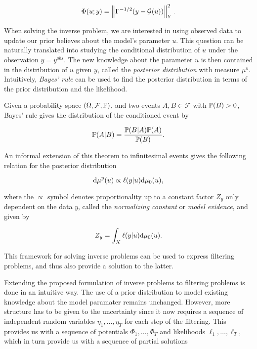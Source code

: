 \begin{equation} \label{gaussian-potential}
  \Phi(u; y) = \norm{\Gamma^{-1/2}(y - \G(u))}_Y^2.
\end{equation}

When solving the inverse problem, we are interested in using observed data to update our prior believes about the model's parameter $u$. This question can be naturally translated into studying the conditional distribution of $u$ under the observation $y = y^{obs}$. The new knowledge about the parameter $u$ is then contained in the distribution of $u$ given $y$, called the \textit{posterior distribution} with measure $\mu^y$. Intuitively, \textit{Bayes' rule} can be used to find the posterior distribution in terms of the prior distribution and the likelihood.

Given a probability space $(\Omega, \mathcal{F}, \P)$, and two events $A, B \in \mathcal{F}$ with $\P(B) > 0$, Bayes' rule gives the distribution of the conditioned event by

\begin{equation*}
  \P(A|B) = \frac{\P(B|A)\P(A)}{\P(B)}.
\end{equation*}

An informal extension of this theorem to infinitesimal events gives the following relation for the posterior distribution 

\begin{equation}\label{bayes-rule}
  \d\mu^y(u) \propto \ell(y|u)\d\mu_0(u),
\end{equation}

where the $\propto$ symbol denotes proportionality up to a constant factor $Z_y$ only dependent on the data $y$, called the \textit{normalizing constant} or \textit{model evidence}, and given by

\begin{equation}
 Z_y = \int_X \ell(y|u)\d\mu_0(u).
\end{equation}

This framework for solving inverse problems can be used to express filtering problems, and thus also provide a solution to the latter. 

Extending the proposed formulation of inverse problems to filtering problems is done in an intuitive way. The use of a prior distribution to model existing knowledge about the model paramater remains unchanged. However, more structure has to be given to the uncertainty since it now requires a sequence of independent random variables $\eta_1, \ldots, \eta_T$ for each step of the filtering. This provides us with a sequence of potentials $\Phi_1, \ldots, \Phi_T$ and likelihoods $\ell_1, \ldots, \ell_T$, which in turn provide us with a sequence of partial solutions

